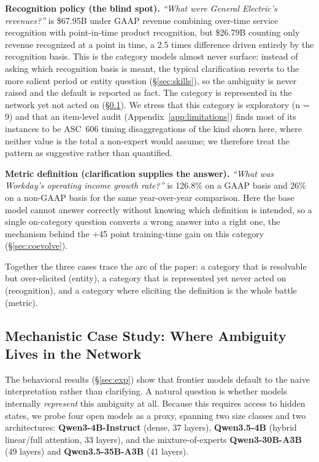\textbf{Recognition policy (the blind spot).} \emph{``What were General Electric's
revenues?''} is \$67.95B under GAAP revenue combining over-time service recognition with
point-in-time product recognition, but \$26.79B counting only revenue recognized at a
point in time, a 2.5 times difference driven entirely by the recognition basis. This is
the category models almost never surface: instead of asking which recognition basis is
meant, the typical clarification reverts to the more salient period or entity question
(\S\ref{sec:skills}), so the ambiguity is never raised and the default is reported as
fact. The category is represented in the network yet not acted on
(\S\ref{sec:mechanistic}). We stress that this category is exploratory (n = 9) and that
an item-level audit (Appendix~\ref{app:limitations}) finds most of its instances to be
ASC~606 timing disaggregations of the kind shown here, where neither value is the total a
non-expert would assume; we therefore treat the pattern as suggestive rather than
quantified.

\textbf{Metric definition (clarification supplies the answer).} \emph{``What was
Workday's operating income growth rate?''} is 126.8\% on a GAAP basis and 26\% on
a non-GAAP basis for the same year-over-year comparison. Here the base model cannot
answer correctly without knowing which definition is intended, so a single on-category
question converts a wrong answer into a right one, the mechanism behind the +45
point training-time gain on this category (\S\ref{sec:coevolve}).

Together the three cases trace the arc of the paper: a category that is resolvable but
over-elicited (entity), a category that is represented yet never acted on (recognition),
and a category where eliciting the definition is the whole battle (metric).

\subsection{Mechanistic Case Study: Where Ambiguity Lives in the Network}
\label{sec:mechanistic}

The behavioral results (\S\ref{sec:exp}) show that frontier models default to the naive
interpretation rather than clarifying. A natural question is whether models internally
\emph{represent} this ambiguity at all. Because this requires access to hidden states, we probe
four open models as a proxy, spanning two size classes and two architectures:
\textbf{Qwen3-4B-Instruct} (dense, 37 layers), \textbf{Qwen3.5-4B} (hybrid linear/full attention,
33 layers), and the mixture-of-experts \textbf{Qwen3-30B-A3B} (49 layers) and
\textbf{Qwen3.5-35B-A3B} (41 layers).

